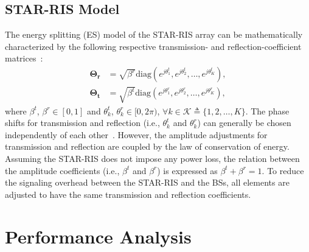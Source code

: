 \documentclass[conference]{IEEEtran}
\begin{document}
\subsection{STAR-RIS Model}
The energy splitting (ES) model of the STAR-RIS array can be mathematically characterized by the following respective transmission- and reflection-coefficient matrices~\cite{mu2021simultaneously}:
\begin{align}
    \mathbf{\Theta_r} & = \sqrt{\beta^r}\text{diag}(e^{j \theta_1^t}, e^{j \theta_2^t}, \dots, e^{j \theta_K^t}), \\
    \mathbf{\Theta_t} & = \sqrt{\beta^t}\text{diag}(e^{j \theta_1^r}, e^{j \theta_2^r}, \dots, e^{j \theta_K^r}),
\end{align}
where $\beta^t$, $\beta^r \in [0, 1]$ and $\theta_k^t$, $\theta_k^r \in [0, 2 \pi)$, $\forall k \in \mathcal{K} \triangleq \{1, 2,\dots,K\}$. The phase shifts for transmission and reflection (i.e., $\theta_k^t$ and $\theta_k^r$) can generally be chosen independently of each other~\cite{9437234}. However, the amplitude adjustments for transmission and reflection are coupled by the law of conservation of energy. Assuming the STAR-RIS does not impose any power loss, the relation between the amplitude coefficients (i.e., $\beta^t$ and $\beta^r$) is expressed as $\beta^t + \beta^r = 1$. To reduce the signaling overhead between the STAR-RIS and the BSs, all elements are adjusted to have the same transmission and reflection coefficients.


\section{Performance Analysis}
\end{document}
